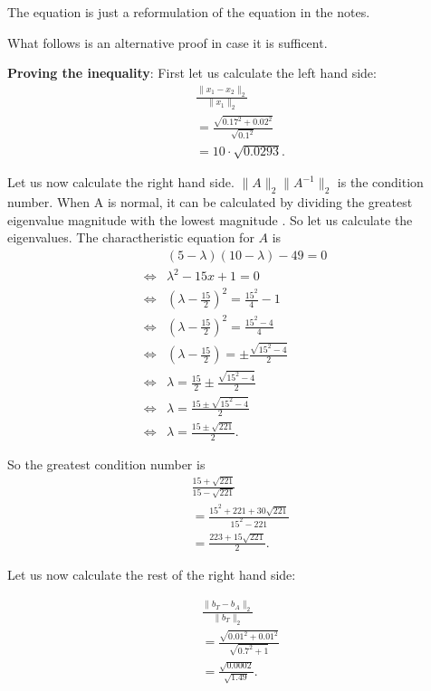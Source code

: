 \documentclass[10pt]{article}
\begin{document}
\begin{solution}[4]
The equation is just a reformulation of the equation in the notes.

What follows is an alternative proof in case it is sufficent.

\textbf{Proving the inequality}:
First let us calculate the left hand side:
\begin{align*}
 &  \frac{\| x_1 - x_2 \| _{2}}{\| x_1 \| _{2}} \\
& = \frac{\sqrt{0.17 ^2 + 0.02 ^2}}{\sqrt{0.1 ^2}} \\
& = 10 \cdot \sqrt{0.0293}
.
\end{align*}


Let us now calculate the right hand side.
\(\| A \| _{2} \| A^{-1}  \| _{2}\) is the condition number. When A is normal, it can
be calculated by dividing the greatest eigenvalue magnitude with
the lowest magnitude . So let us
calculate the eigenvalues.
The charactheristic equation for \(A\) is
\begin{align*}
 &  (5- \lambda) (10 - \lambda) - 49 = 0 \\
\iff & \lambda ^2 - 15x + 1 = 0 \\
\iff & (\lambda - \frac{15}{2}) ^2  = \frac{15 ^2}{4}  -1 \\
\iff & (\lambda - \frac{15}{2}) ^2  = \frac{15 ^2 - 4}{4} \\
\iff & (\lambda - \frac{15}{2})  = \pm \frac{\sqrt{15 ^2 - 4}}{2} \\
\iff & \lambda  = \frac{15}{2} \pm \frac{\sqrt{15 ^2 - 4}}{2} \\
\iff & \lambda  =  \frac{15 \pm \sqrt{15 ^2 - 4}}{2} \\
\iff & \lambda  =  \frac{15 \pm \sqrt{221}}{2}
.
\end{align*}

So the greatest condition number is
\begin{align*}
 &  \frac{15 + \sqrt{221}}{15 - \sqrt{221}} \\
& = \frac{15 ^2 + 221 + 30 \sqrt{221}}{15 ^2 - 221} \\
& = \frac{223 + 15 \sqrt{221}}{2} 
.
\end{align*}


Let us now calculate the rest of the right hand side:

\begin{align*}
 &  \frac{\| b_T - b_A \| _{2}}{\| b_T \| _{2}} \\
& = \frac{\sqrt{0.01 ^2 + 0.01 ^2}}{\sqrt{0.7 ^2 + 1}} \\
& = \frac{\sqrt{0.0002}}{\sqrt{1.49}} 
.
\end{align*}


\end{solution}
\end{document}
